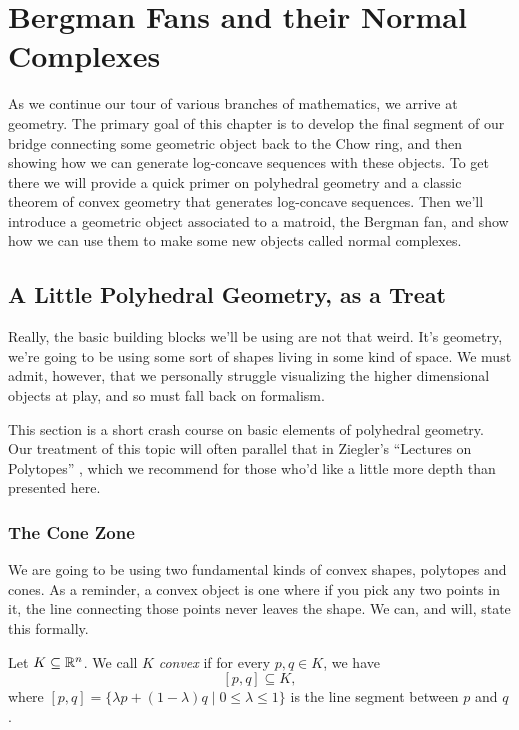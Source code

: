 \documentclass[12pt,oneside]{../../sfsuthesis}
\begin{document}
\chapter{Bergman Fans and their Normal Complexes}
As we continue our tour of various branches of mathematics, we arrive at geometry.
The primary goal of this chapter is to develop the final segment of our bridge connecting some geometric object back to the Chow ring, and then showing how we can generate log-concave sequences with these objects.
To get there we will provide a quick primer on polyhedral geometry and a classic theorem of convex geometry that generates log-concave sequences.
Then we'll introduce a geometric object associated to a matroid, the Bergman fan, and show how we can use them to make some new objects called normal complexes.

\section{A Little Polyhedral Geometry, as a Treat}
Really, the basic building blocks we'll be using are not that weird.
It's geometry, we're going to be using some sort of shapes living in some kind of space.
We must admit, however, that we personally struggle visualizing the higher dimensional objects at play, and so must fall back on formalism.

This section is a short crash course on basic elements of polyhedral geometry.
Our treatment of this topic will often parallel that in Ziegler's ``Lectures on Polytopes'' \cite{zieglerLecturesPolytopes1995}, which we recommend for those who'd like a little more depth than presented here.

\subsection{The Cone Zone}
We are going to be using two fundamental kinds of convex shapes, polytopes and cones.
As a reminder, a convex object is one where if you pick any two points in it, the line connecting those points never leaves the shape.
We can, and will, state this formally.
\begin{definition}[Convexity]\label{def:convex}
    Let \( K \subseteq \mathbb{R}^n \).
    We call \( K \) \emph{convex} if for every \( p, q \in K \), we have
    \[
        [p, q] \subseteq K,
    \]
    where \( [p, q] = \{ \lambda p + (1 - \lambda) q \; | \; 0 \leq \lambda \leq 1 \} \) is the line segment between \( p \) and \( q \).
\end{definition}
\end{document}
